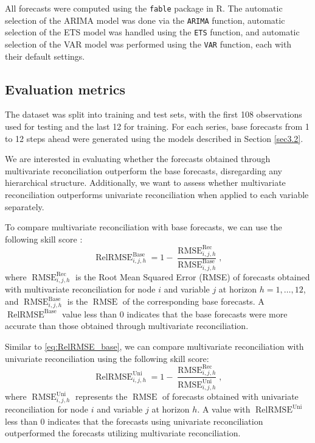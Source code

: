\documentclass[a4paper,preprint,11pt,authoryear]{elsarticle}
\DeclareMathOperator{\RMSE}{RMSE}
\DeclareMathOperator{\RelRMSE}{RelRMSE}
\DeclareMathOperator{\Base}{Base}
\DeclareMathOperator{\Rec}{Rec}
\DeclareMathOperator{\Uni}{Uni}
\begin{document}
All forecasts were computed using the \texttt{fable} package in {\sf R}. The automatic selection of the ARIMA model was done via the \texttt{ARIMA} function, automatic selection of the ETS model was handled using the \texttt{ETS} function, and automatic selection of the VAR model was performed using the \texttt{VAR} function, each with their default settings.

\subsection{Evaluation metrics}
\label{sec3.3}

The dataset was split into training and test sets, with the first 108 observations used for testing and the last 12 for training. For each series, base forecasts from 1 to 12 steps ahead were generated using the models described in Section \ref{sec3.2}.

We are interested in evaluating whether the forecasts obtained through multivariate reconciliation outperform the base forecasts, disregarding any hierarchical structure. Additionally, we want to assess whether multivariate reconciliation outperforms univariate reconciliation when applied to each variable separately.

To compare multivariate reconciliation with base forecasts, we can use the following skill score \citep{hyndman2021forecasting}:
\begin{equation}
  \RelRMSE^{\Base}_{i,j,h} = 1 - \frac{\RMSE^{\Rec}_{i,j,h}}{\RMSE^{\Base}_{i,j,h}},
  \label{eq:RelRMSE_base}
\end{equation}
where $\RMSE^{\Rec}_{i,j,h}$ is the Root Mean Squared Error (RMSE) of forecasts obtained with multivariate reconciliation for node $i$ and variable $j$ at horizon $h = 1, \dots, 12$, and $\RMSE^{\Base}_{i,j, h}$ is the $\RMSE$ of the corresponding base forecasts. A $\RelRMSE^{\Base}$ value less than 0 indicates that the base forecasts were more accurate than those obtained through multivariate reconciliation.

Similar to \eqref{eq:RelRMSE_base}, we can compare multivariate reconciliation with univariate reconciliation using the following skill score:
\begin{equation}
  \RelRMSE^{\Uni}_{i,j,h} = 1 - \frac{\RMSE^{\Rec}_{i,j,h}}{\RMSE^{\Uni}_{i,j,h}},
  \label{eq:RelRMSE_uni}
\end{equation}
where $\RMSE^{\Uni}_{i,j,h}$ represents the $\RMSE$ of forecasts obtained with univariate reconciliation for node $i$ and variable $j$ at horizon $h$. A value with $\RelRMSE^{\Uni}$ less than 0 indicates that the forecasts using univariate reconciliation outperformed the forecasts utilizing multivariate reconciliation.
\end{document}
